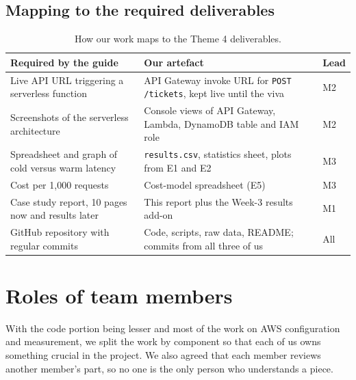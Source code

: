 \documentclass[10pt,a4paper]{article}
\newcommand{\code}[1]{\texttt{#1}}
\begin{document}
\subsection{Mapping to the required deliverables}

\begin{table}[ht]
\centering\small
\caption{How our work maps to the Theme 4 deliverables.}\label{tab:deliv}
\begin{tabularx}{\textwidth}{@{}Y Y l@{}}
\toprule
Required by the guide & Our artefact & Lead \\
\midrule
Live API URL triggering a serverless function & API Gateway invoke URL for \code{POST /tickets}, kept live until the viva & M2 \\
Screenshots of the serverless architecture & Console views of API Gateway, Lambda, DynamoDB table and IAM role & M2 \\
Spreadsheet and graph of cold versus warm latency & \code{results.csv}, statistics sheet, plots from E1 and E2 & M3 \\
Cost per 1{,}000 requests & Cost-model spreadsheet (E5) & M3 \\
Case study report, 10 pages now and results later & This report plus the Week-3 results add-on & M1 \\
GitHub repository with regular commits & Code, scripts, raw data, README; commits from all three of us & All \\
\bottomrule
\end{tabularx}
\end{table}

\section{Roles of team members}

With the code portion being lesser and most of the work on AWS configuration and measurement, we split the work by component so that each of us owns something crucial in the project. We also agreed that each member reviews another member's part, so no one is the only person who understands a piece.
\end{document}
